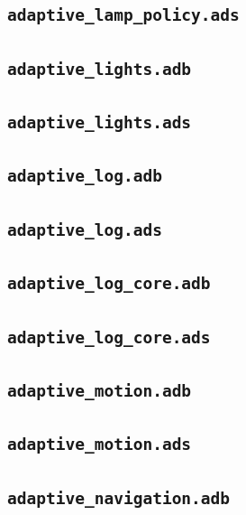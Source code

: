 \subsection*{\texttt{adaptive\_lamp\_policy.ads}}

\subsection*{\texttt{adaptive\_lights.adb}}

\subsection*{\texttt{adaptive\_lights.ads}}

\subsection*{\texttt{adaptive\_log.adb}}

\subsection*{\texttt{adaptive\_log.ads}}

\subsection*{\texttt{adaptive\_log\_core.adb}}

\subsection*{\texttt{adaptive\_log\_core.ads}}

\subsection*{\texttt{adaptive\_motion.adb}}

\subsection*{\texttt{adaptive\_motion.ads}}

\subsection*{\texttt{adaptive\_navigation.adb}}

